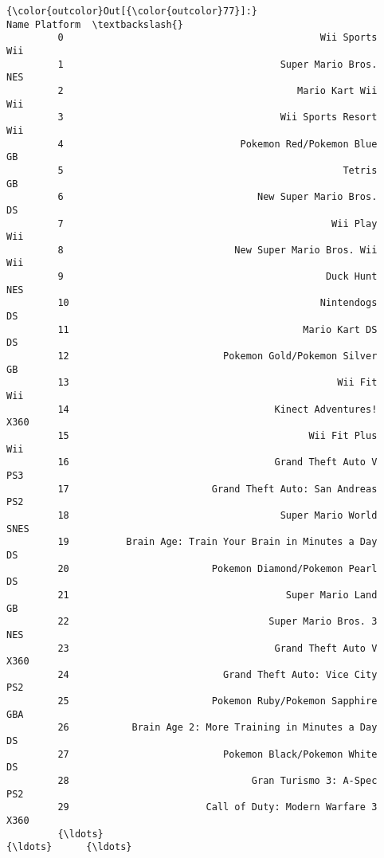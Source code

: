 \documentclass[11pt]{article}
\begin{document}
\begin{Verbatim}[commandchars=\\\{\}]
{\color{outcolor}Out[{\color{outcolor}77}]:}                                                     Name Platform  \textbackslash{}
         0                                             Wii Sports      Wii   
         1                                      Super Mario Bros.      NES   
         2                                         Mario Kart Wii      Wii   
         3                                      Wii Sports Resort      Wii   
         4                               Pokemon Red/Pokemon Blue       GB   
         5                                                 Tetris       GB   
         6                                  New Super Mario Bros.       DS   
         7                                               Wii Play      Wii   
         8                              New Super Mario Bros. Wii      Wii   
         9                                              Duck Hunt      NES   
         10                                            Nintendogs       DS   
         11                                         Mario Kart DS       DS   
         12                           Pokemon Gold/Pokemon Silver       GB   
         13                                               Wii Fit      Wii   
         14                                    Kinect Adventures!     X360   
         15                                          Wii Fit Plus      Wii   
         16                                    Grand Theft Auto V      PS3   
         17                         Grand Theft Auto: San Andreas      PS2   
         18                                     Super Mario World     SNES   
         19          Brain Age: Train Your Brain in Minutes a Day       DS   
         20                         Pokemon Diamond/Pokemon Pearl       DS   
         21                                      Super Mario Land       GB   
         22                                   Super Mario Bros. 3      NES   
         23                                    Grand Theft Auto V     X360   
         24                           Grand Theft Auto: Vice City      PS2   
         25                         Pokemon Ruby/Pokemon Sapphire      GBA   
         26           Brain Age 2: More Training in Minutes a Day       DS   
         27                           Pokemon Black/Pokemon White       DS   
         28                                Gran Turismo 3: A-Spec      PS2   
         29                        Call of Duty: Modern Warfare 3     X360   
         {\ldots}                                                  {\ldots}      {\ldots}   

\end{Verbatim}
\end{document}
